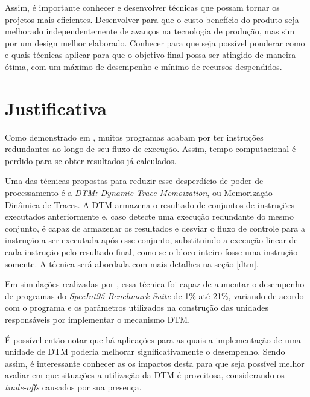 Assim, é importante conhecer e desenvolver técnicas que possam tornar os projetos mais eficientes. Desenvolver para que o custo-benefício do produto seja melhorado independentemente de avanços na tecnologia de produção, mas sim por um design melhor elaborado. Conhecer para que seja possível ponderar como e quais técnicas aplicar para que o objetivo final possa ser atingido de maneira ótima, com um máximo de desempenho e mínimo de recursos despendidos.



\section{Justificativa}
\label{Introducao:Justificativa} %


Como demonstrado em \cite{costa2001explorando}, muitos programas acabam por ter instruções redundantes ao longo de seu fluxo de execução. Assim, tempo computacional é perdido para se obter resultados já calculados.

Uma das técnicas propostas para reduzir esse desperdício de poder de processamento é a \textit{DTM: Dynamic Trace Memoization}, ou Memorização Dinâmica de Traces. A DTM armazena o resultado de conjuntos de instruções executados anteriormente e, caso detecte uma execução redundante do mesmo conjunto, é capaz de armazenar os resultados e desviar o fluxo de controle para a instrução a ser executada após esse conjunto, substituindo a execução linear de cada instrução pelo resultado final, como se o bloco inteiro fosse uma instrução somente. A técnica será abordada com mais detalhes na seção \ref{dtm}.

Em simulações realizadas por \cite{costa2001explorando}, essa técnica foi capaz de aumentar o desempenho de programas do \textit{SpecInt95 Benchmark Suite} de 1\% até 21\%, variando de acordo com o programa e os parâmetros utilizados na construção das unidades responsáveis por implementar o mecanismo DTM.

É possível então notar que há aplicações para as quais a implementação de uma unidade de DTM poderia melhorar significativamente o desempenho. Sendo assim, é interessante conhecer as os impactos desta para que seja possível melhor avaliar em que situações a utilização da DTM é proveitosa, considerando os \textit{trade-offs} causados por sua presença.

